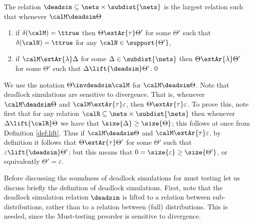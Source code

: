 \documentclass{LMCS}
\begin{document}
\begin{defi}
\label{def:ds}
The relation $\deadsim \subseteq \nets \times \subdist{\nets}$ is 
the largest relation such that whenever $\calM \deadsim \Theta$
\begin{enumerate}[label=(\roman*)]
\item if $\delta(\calM) = \ttrue$ then $\Theta \extAr{\tau} \Theta'$ 
for some $\Theta'$ such that $\delta(\calN) = \ttrue$ for any 
$\calN \in \support{\Theta'}$, 
\item if $\calM \extAr{\lambda} \Delta$ for some 
$\Delta \in \subdist{\nets}$ then $\Theta \extAr{\lambda} \Theta'$ 
for some $\Theta'$ such that $\Delta \lift{\deadsim} \Theta'$.\qed
\end{enumerate}
\end{defi}
\noindent
We use the notation $\Theta \invdeadsim \calM$ for 
$\calM \deadsim \Theta$.
Note that deadlock simulations are sensitive to divergence. 
That is, whenever $\calM \deadsim \Theta$ and $\calM \extAr{\tau} \varepsilon$, 
then $\Theta \extAr{\tau} \varepsilon$. 
To prove this, note first that for any relation 
$\calR \subseteq \nets \times \subdist{\nets}$ then 
whenever $\Delta \lift{\calR} \Theta$ we have that  
$\size{\Delta} \geq \size{\Theta}$; this follows at once 
from Definition \ref{def:lift}. 
Thus if $\calM \deadsim \Theta$ and $\calM \extAr{\tau} \varepsilon$, 
by definition it follows that $\Theta \extAr{\tau} \Theta'$ 
for some $\Theta'$ such that $\varepsilon \lift{\deadsim} \Theta'$; 
but this means that $0 = \size{\varepsilon} \geq \size{\Theta'}$, 
or equivalently $\Theta' = \varepsilon$.

Before discussing the soundness of deadlock simulations for must testing
let us discuss briefly the definition of 
deadlock simulations.
First, note that the deadlock simulation relation $\deadsim$ is 
lifted to a relation between sub-distributions, rather than 
to a relation between (full) distributions. 
This is needed, since the Must-testing preorder is 
sensitive to divergence.
\end{document}

